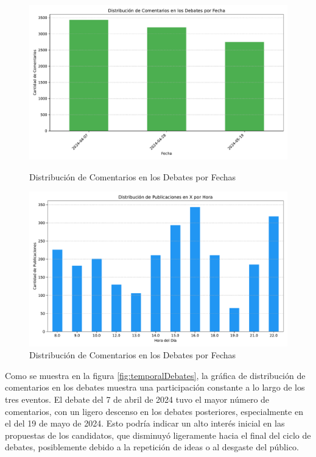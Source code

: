 \documentclass[10pt, a4paper]{article}
\begin{document}
	\begin{figure}[h!]
		\centering
		\begin{minipage}{0.49\textwidth} %
			\includegraphics[width=\linewidth]{comentarios_fecha.pdf} 
			\vspace{-5mm}
			\caption{Distribución de Comentarios en los Debates por Fechas}
			\label{fig:temporalDebates}
		\end{minipage}
		\hfill %
		\begin{minipage}{0.49\textwidth}
			\includegraphics[width=\linewidth]{publicaciones_por_hora.pdf}
			\vspace{-5mm}
			\caption{Distribución de Comentarios en los Debates por Fechas}
			\label{fig:temporalDiaEleccion}
		\end{minipage}
	\end{figure}
	\vspace{-5mm}
	Como se muestra en la figura \ref{fig:temporalDebates}, la gráfica de distribución de comentarios en los debates muestra una participación constante a lo largo de los tres eventos. El debate del 7 de abril de 2024 tuvo el mayor número de comentarios, con un ligero descenso en los debates posteriores, especialmente en el del 19 de mayo de 2024. Esto podría indicar un alto interés inicial en las propuestas de los candidatos, que disminuyó ligeramente hacia el final del ciclo de debates, posiblemente debido a la repetición de ideas o al desgaste del público.
	
\end{document}
